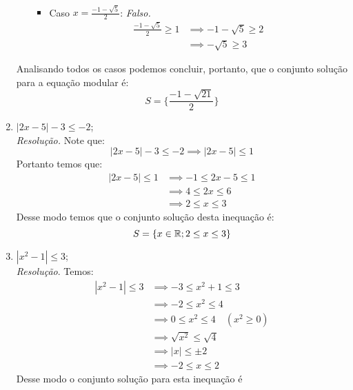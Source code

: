 \begin{enumerate}
\begin{itemize}
\begin{itemize}
\begin{align*}
            \end{align*}
            \item Caso $x = \frac{-1 - \sqrt{5}}{2}$: \emph{Falso.}
            \begin{align*}
                \frac{-1 - \sqrt{5}}{2} \ge 1 & \implies -1 -\sqrt{5} \ge 2
                \\ & \implies 
                -\sqrt{5} \ge 3
            \end{align*}
        \end{itemize}
    \end{itemize}
    Analisando todos os casos podemos concluir, portanto, que o conjunto solução para a equação modular é:
    \begin{displaymath}
        S = \{ \frac{-1 - \sqrt{21}}{2} \}
    \end{displaymath}
    \item $|2x - 5| - 3 \le -2$;
    \\ \emph{Resolução.} Note que:
    \begin{displaymath}
        |2x - 5| -3 \le -2 \implies |2x - 5| \le 1
    \end{displaymath}
    Portanto temos que:
    \begin{align*}
        |2x - 5| \le 1 & \implies -1 \le 2x - 5 \le 1 \\ & \implies
        4 \le 2x \le 6 \\ & \implies
        2 \le x \le 3
    \end{align*}
    Desse modo temos que o conjunto solução desta inequação é:
    \begin{displaymath}
        S = \{ x \in \mathbb R; 2 \le x \le 3\}
    \end{displaymath}
    \item $|x^2 - 1| \le 3$;
    \\ \emph{Resolução}. Temos:
    \begin{align*}
        |x^2 - 1| \le 3 & \implies -3 \le x^2 + 1 \le 3 \\ & \implies
        -2 \le x^2 \le 4 \\ & \implies
        0 \le x^2 \le 4 \quad (x^2 \ge 0) \\ & \implies
        \sqrt{x^2} \le \sqrt{4} \\ & \implies
        |x| \le \pm 2 \\ & \implies
        -2 \le x \le 2
    \end{align*}
    Desse modo o conjunto solução para esta inequação é
    \begin{displaymath}

\end{displaymath}
\end{enumerate}
